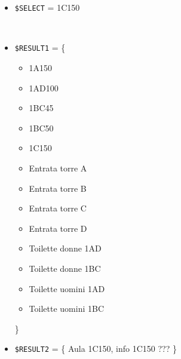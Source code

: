 \documentclass[../../Sperimentazione.tex]{subfiles}
\begin{document}
			\paragraph*{}
			\label{Prova12A.1}
			\begin{tcolorbox}[fonttitle=\bfseries, 
								adjusted title={\Large Prova 12A.1}, 
								breakable, 
								sharp corners=south,
								colback=white, 
								colframe=white!60!black]
								
				\begin{description}[leftmargin=0.7cm,labelwidth=!]
				
					\item[Input] \ \par 
        				\begin{itemize}
        					\item \verb|$SELECT| = 1C150
        				\end{itemize}
        				
        			\tcbline 
        				
        			\item[Output atteso] \ \par
        				\begin{itemize}
        					\item \verb|$RESULT1| = \{
        					\begin{itemize}
        						\item 1A150
								\item 1AD100
								\item 1BC45
								\item 1BC50
								\item 1C150
								\item Entrata torre A
								\item Entrata torre B
								\item Entrata torre C
								\item Entrata torre D
								\item Toilette donne 1AD
								\item Toilette donne 1BC
								\item Toilette uomini 1AD
								\item Toilette uomini 1BC
        					\end{itemize}
        					\}
        					\item \verb|$RESULT2| = \{
        						Aula 1C150, info 1C150  ???
        					\}
        				\end{itemize}


\end{description}
\end{tcolorbox}
\end{document}
